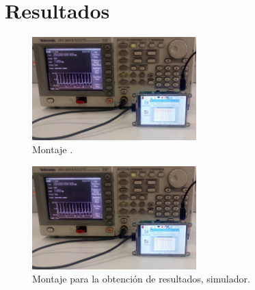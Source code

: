 \documentclass[journal]{IEEEtran}
\begin{document}
\section{Resultados}


\begin{figure}[!h]
	\centering
	\includegraphics[width=2.5in]{montaje}
	\caption{Montaje .}
	\label{montaje_generador_rpi}
\end{figure}


\begin{figure}[!h]
	\centering
	\includegraphics[width=2.5in]{montaje}
	\caption{Montaje para la obtención de resultados, simulador.}
	\label{montaje_generador_rpi}
\end{figure}
\end{document}
